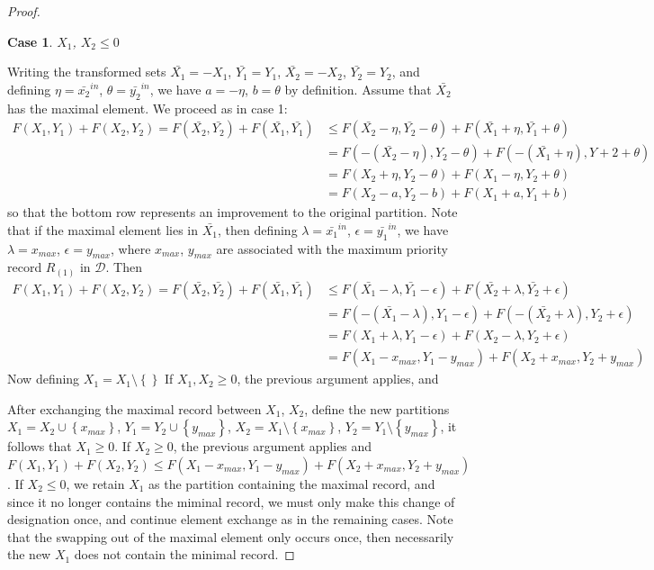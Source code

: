 \documentclass{article}
\theoremstyle{case}
\newtheorem{case}{Case}
\begin{document}
\begin{proof}
\begin{case}
$X_1$,  $X_2 \leq 0$
\end{case}
Writing the transformed sets $\bar{X_1} = -X_1$, $\bar{Y_1} = Y_1$, $\bar{X_2} = -X_2$, $\bar{Y_2} = Y_2$, and defining $\eta = \bar{x_2}^{in}$, $\theta = \bar{y_2}^{in}$, we have $a = -\eta$, $b = \theta$ by definition. Assume that $\bar{X_2}$ has the maximal element. We proceed as in case 1:
\begin{align*}
F(X_1, Y_1) + F(X_2, Y_2) = F(\bar{X_2}, \bar{Y_2}) + F(\bar{X_1}, \bar{Y_1}) & \leq F(\bar{X_2} - \eta, \bar{Y_2} - \theta) + F(\bar{X_1} + \eta, \bar{Y_1} + \theta) \\
& = F(-\left( \bar{X_2} - \eta\right), Y_2 - \theta) + F(-\left( \bar{X_1} + \eta \right), Y+2 + \theta) \\
& = F(X_2 + \eta, Y_2 - \theta) + F(X_1 - \eta, Y_2 + \theta) \\
& = F(X_2 - a, Y_2 - b) + F(X_1 + a, Y_1 + b)
\end{align*}
so that the bottom row represents an improvement to the original partition.
Note that if the maximal element lies in $\bar{X_1}$, then defining $\lambda = \bar{x_1}^{in}$, $\epsilon = \bar{y_1}^{in}$, we have $\lambda = x_{max}$, $\epsilon = y_{max}$, where $x_{max}$, $y_{max}$ are associated with the maximum priority record $R_{(1)}$ in $\mathcal{D}$. Then
\begin{align*}
F(X_1, Y_1) + F(X_2, Y_2) = F(\bar{X_2}, \bar{Y_2}) + F(\bar{X_1}, \bar{Y_1}) & \leq F(\bar{X_1} - \lambda, \bar{Y_1} - \epsilon) + F(\bar{X_2} + \lambda, \bar{Y_2} + \epsilon) \\
& = F(-\left( \bar{X_1} - \lambda\right), Y_1 - \epsilon) + F(-\left( \bar{X_2} + \lambda \right), Y_2 + \epsilon) \\
& = F(X_1 + \lambda, Y_1 - \epsilon) + F(X_2 - \lambda, Y_2 + \epsilon) \\
& = F(X_1 - x_{max}, Y_1 - y_{max}) + F(X_2 + x_{max}, Y_2 + y_{max})
\end{align*}
Now defining $X_1 = X_1\setminus\left\lbrace \right\rbrace$ If $X_1, X_2 \geq 0$, the previous argument applies, and 


After exchanging the maximal record between $X_1$, $X_2$, define the new partitions $X_1 = X_2\cup \left\lbrace x_{max}\right\rbrace$, $Y_1 = Y_2\cup \left\lbrace y_{max}\right\rbrace$, $X_2 = X_1\setminus \left\lbrace x_{max}\right\rbrace$, $Y_2 = Y_1\setminus \left\lbrace y_{max}\right\rbrace$, it follows that $X_1 \geq 0$. If $X_2 \geq 0$, the previous argument applies and $F(X_1, Y_1) + F(X_2, Y_2) \leq F(X_1 - x_{max}, Y_1 - y_{max}) + F(X_2 + x_{max}, Y_2 + y_{max})$. If $X_2 \leq 0$, we retain $X_1$ as the partition containing the maximal record, and since it no longer contains the miminal record, we must only make this change of designation once, and continue element exchange as in the remaining cases. Note that the swapping out of the maximal element only occurs once, then necessarily the new $X_1$ does not contain the minimal record.


\end{proof}
\end{document}
